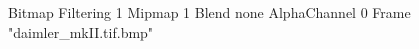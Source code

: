 {Bitmap
	{Filtering 1}
	{Mipmap 1}
	{Blend none}
	{AlphaChannel 0}
	{Frame "daimler_mkII.tif.bmp"}
}
